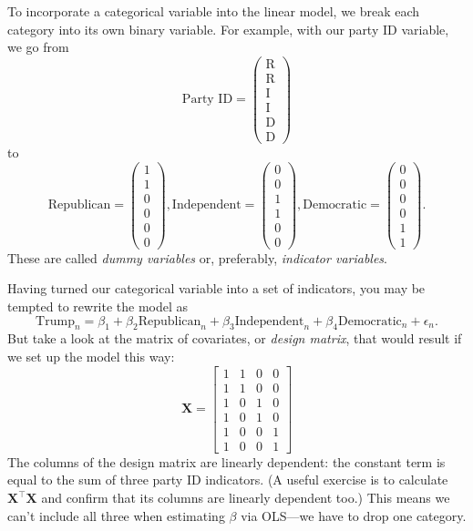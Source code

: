 \documentclass[
  12pt,
  oneside,openany]{book}
\begin{document}
To incorporate a categorical variable into the linear model, we break each category into its own binary variable. For example, with our party ID variable, we go from
\[
\text{Party ID} = \begin{pmatrix}
\text{R} \\
\text{R} \\
\text{I} \\
\text{I} \\
\text{D} \\
\text{D}
\end{pmatrix}
\]
to
\[
\text{Republican} = \begin{pmatrix} 1 \\ 1 \\ 0 \\ 0 \\ 0 \\ 0 \end{pmatrix},
\text{Independent} = \begin{pmatrix} 0 \\ 0 \\ 1 \\ 1 \\ 0 \\ 0 \end{pmatrix},
\text{Democratic} = \begin{pmatrix} 0 \\ 0 \\ 0 \\ 0 \\ 1 \\ 1 \end{pmatrix}.
\]
These are called \emph{dummy variables} or, preferably, \emph{indicator variables}.

Having turned our categorical variable into a set of indicators, you may be tempted to rewrite the model as
\[
\text{Trump}_n = \beta_1 + \beta_2 \text{Republican}_n + \beta_3 \text{Independent}_n + \beta_4 \text{Democratic}_n + \epsilon_n.
\]
But take a look at the matrix of covariates, or \emph{design matrix}, that would result if we set up the model this way:
\[
\mathbf{X} = \begin{bmatrix}
  1 & 1 & 0 & 0 \\
  1 & 1 & 0 & 0 \\
  1 & 0 & 1 & 0 \\
  1 & 0 & 1 & 0 \\
  1 & 0 & 0 & 1 \\
  1 & 0 & 0 & 1
\end{bmatrix}
\]
The columns of the design matrix are linearly dependent: the constant term is equal to the sum of three party ID indicators. (A useful exercise is to calculate \(\mathbf{X}^\top \mathbf{X}\) and confirm that its columns are linearly dependent too.) This means we can't include all three when estimating \(\beta\) via OLS---we have to drop one category.
\end{document}
